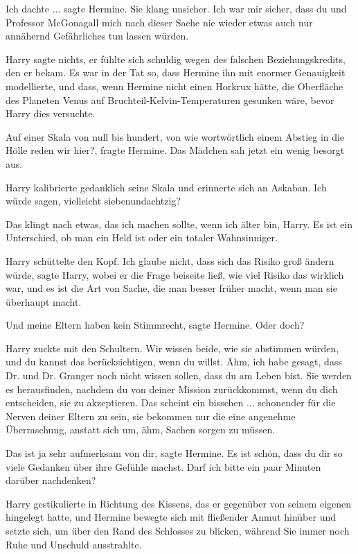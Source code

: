 \glqq{}Ich dachte ...\grqq{} sagte Hermine. Sie klang unsicher. \glqq{}Ich war mir
sicher, dass du und Professor McGonagall mich nach dieser Sache nie wieder etwas
auch nur annähernd Gefährliches tun lassen würden.\grqq{}

Harry sagte nichts, er fühlte sich schuldig wegen des falschen
Beziehungskredits, den er bekam. Es war in der Tat so, dass Hermine ihn mit
enormer Genauigkeit modellierte, und dass, wenn Hermine nicht einen Horkrux
hätte, die Oberfläche des Planeten Venus auf Bruchteil-Kelvin-Temperaturen
gesunken wäre, bevor Harry dies versuchte.

\glqq{}Auf einer Skala von null bis hundert, von wie wortwörtlich einem Abstieg
in die Hölle reden wir hier?\grqq{}, fragte Hermine. Das Mädchen sah jetzt ein
wenig besorgt aus.

Harry kalibrierte gedanklich seine Skala und erinnerte sich an Askaban. \glqq{}
Ich würde sagen, vielleicht siebenundachtzig?\grqq{}

\glqq{}Das klingt nach etwas, das ich machen sollte, wenn ich älter bin, Harry.
Es ist ein Unterschied, ob man ein Held ist oder ein totaler
Wahnsinniger.\grqq{}

Harry schüttelte den Kopf. \glqq{}Ich glaube nicht, dass sich das Risiko groß
ändern würde\grqq{}, sagte Harry, wobei er die Frage beiseite ließ, wie viel
Risiko das wirklich war, \glqq{}und es ist die Art von Sache, die man besser
früher macht, wenn man sie überhaupt macht.\grqq{}

\glqq{}Und meine Eltern haben kein Stimmrecht\grqq{}, sagte Hermine. \glqq{}Oder
doch?\grqq{}

Harry zuckte mit den Schultern. \glqq{}Wir wissen beide, wie sie abstimmen
würden, und du kannst das berücksichtigen, wenn du willst. Ähm, ich habe gesagt,
dass Dr. und Dr. Granger noch nicht wissen sollen, dass du am Leben bist. Sie
werden es herausfinden, nachdem du von deiner Mission zurückkommst, wenn du dich
entscheiden, sie zu akzeptieren. Das scheint ein bisschen ... schonender für die
Nerven deiner Eltern zu sein, sie bekommen nur die eine angenehme Überraschung,
anstatt sich um, ähm, Sachen sorgen zu müssen.\grqq{}

\glqq{}Das ist ja sehr aufmerksam von dir\grqq{}, sagte Hermine. \glqq{}Es ist
schön, dass du dir so viele Gedanken über ihre Gefühle machst. Darf ich bitte
ein paar Minuten darüber nachdenken?\grqq{}

Harry gestikulierte in Richtung des Kissens, das er gegenüber von seinem eigenen
hingelegt hatte, und Hermine bewegte sich mit fließender Anmut hinüber und
setzte sich, um über den Rand des Schlosses zu blicken, während Sie immer noch
Ruhe und Unschuld ausstrahlte.

